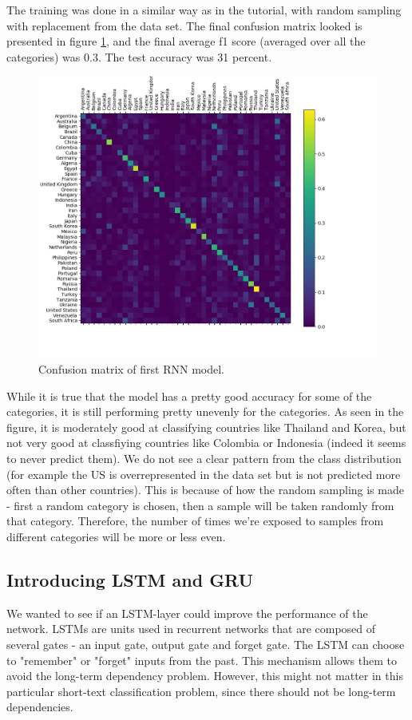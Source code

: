 \documentclass[runningheads]{llncs}
\begin{document}
The training was done in a similar way as in the tutorial, with random sampling with replacement from the data set. The final confusion matrix looked is presented in figure \ref{fig:conf_init},
and the final average f1 score (averaged over all the categories) was 0.3. The test accuracy was 31 percent.

\begin{figure}[h!]
	\centering
        \includegraphics[width=.5\textwidth]{../plots/confusion_matrix_initial.png}
	\caption{ Confusion matrix of first RNN model.}
	\label{fig:conf_init}
\end{figure}


While it is true that the model has a pretty good accuracy for some of the categories, it is still performing pretty unevenly for the categories. As seen in the figure, it is moderately good at classifying countries like Thailand and Korea, but not very good at classfiying countries like Colombia or Indonesia (indeed it seems to never predict them). We do not see a clear pattern from the class distribution (for example the US is overrepresented in the data set but is not predicted more often than other countries). This is because of how the random sampling is made - first a random category is chosen, then a sample will be taken randomly from that category. Therefore, the number of times we're exposed to samples from different categories will be more or less even.

\subsection{Introducing LSTM and GRU}

We wanted to see if an LSTM-layer could improve the performance of the network. LSTMs are units used in recurrent networks that are composed of several gates - an input gate, output gate and forget gate. The LSTM can choose to "remember" or "forget" inputs from the past. This mechanism allows them to avoid the long-term dependency problem. However, this might not matter in this particular short-text classification problem, since there should not be long-term dependencies.
\end{document}

